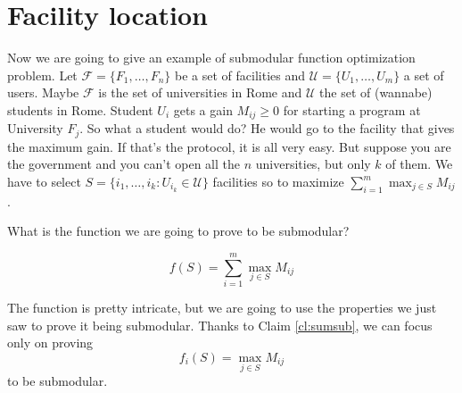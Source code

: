 \section{Facility location}
Now we are going to give an example of submodular function optimization problem. Let $\mathcal{F} = \{F_1, \ldots, F_n\}$ be a set of facilities and $\mathcal{U} = \{U_1,\ldots, U_m\}$ a set of users. Maybe $\mathcal{F}$ is the set of universities in Rome and $\mathcal{U}$ the set of (wannabe) students in Rome. Student $U_i$ gets a gain $M_{ij} \geq 0$ for starting a program at University $F_j$. So what a student would do? He would go to the facility that gives the maximum gain. If that's the protocol, it is all very easy. But suppose you are the government and you can't open all the $n$ universities, but only $k$ of them. We have to select $S = \{i_1,\ldots, i_k : U_{i_k} \in \mathcal{U}\}$ facilities so to maximize $\sum_{i = 1}^m \max_{j \in S} M_{ij}$.

What is the function we are going to prove to be submodular?

\begin{equation}
f(S) = \sum_{i=1}^m\max_{j \in S}M_{ij}
\end{equation}

The function is pretty intricate, but we are going to use the properties we just saw to prove it being submodular. Thanks to Claim \ref{cl:sumsub}, we can focus only on proving 
\begin{equation}
	f_i(S) = \max_{j \in S}M_{ij}
\end{equation}
to be submodular.

